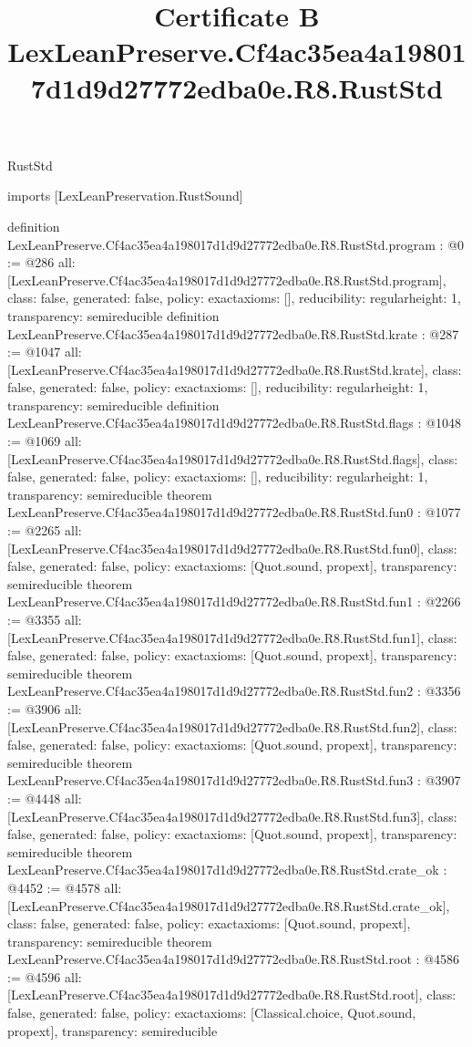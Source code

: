\begin{lexlean}{RustStd}
\title{Certificate B LexLeanPreserve.Cf4ac35ea4a198017d1d9d27772edba0e.R8.RustStd}
\begin{coremodule}
imports [LexLeanPreservation.RustSound]

definition LexLeanPreserve.Cf4ac35ea4a198017d1d9d27772edba0e.R8.RustStd.program : @0 := @286 {
  all: [LexLeanPreserve.Cf4ac35ea4a198017d1d9d27772edba0e.R8.RustStd.program],
  class: false,
  generated: false,
  policy: exact{axioms: []},
  reducibility: regular{height: 1},
  transparency: semireducible
}
definition LexLeanPreserve.Cf4ac35ea4a198017d1d9d27772edba0e.R8.RustStd.krate : @287 := @1047 {
  all: [LexLeanPreserve.Cf4ac35ea4a198017d1d9d27772edba0e.R8.RustStd.krate],
  class: false,
  generated: false,
  policy: exact{axioms: []},
  reducibility: regular{height: 1},
  transparency: semireducible
}
definition LexLeanPreserve.Cf4ac35ea4a198017d1d9d27772edba0e.R8.RustStd.flags : @1048 := @1069 {
  all: [LexLeanPreserve.Cf4ac35ea4a198017d1d9d27772edba0e.R8.RustStd.flags],
  class: false,
  generated: false,
  policy: exact{axioms: []},
  reducibility: regular{height: 1},
  transparency: semireducible
}
theorem LexLeanPreserve.Cf4ac35ea4a198017d1d9d27772edba0e.R8.RustStd.fun0 : @1077 := @2265 {
  all: [LexLeanPreserve.Cf4ac35ea4a198017d1d9d27772edba0e.R8.RustStd.fun0],
  class: false,
  generated: false,
  policy: exact{axioms: [Quot.sound, propext]},
  transparency: semireducible
}
theorem LexLeanPreserve.Cf4ac35ea4a198017d1d9d27772edba0e.R8.RustStd.fun1 : @2266 := @3355 {
  all: [LexLeanPreserve.Cf4ac35ea4a198017d1d9d27772edba0e.R8.RustStd.fun1],
  class: false,
  generated: false,
  policy: exact{axioms: [Quot.sound, propext]},
  transparency: semireducible
}
theorem LexLeanPreserve.Cf4ac35ea4a198017d1d9d27772edba0e.R8.RustStd.fun2 : @3356 := @3906 {
  all: [LexLeanPreserve.Cf4ac35ea4a198017d1d9d27772edba0e.R8.RustStd.fun2],
  class: false,
  generated: false,
  policy: exact{axioms: [Quot.sound, propext]},
  transparency: semireducible
}
theorem LexLeanPreserve.Cf4ac35ea4a198017d1d9d27772edba0e.R8.RustStd.fun3 : @3907 := @4448 {
  all: [LexLeanPreserve.Cf4ac35ea4a198017d1d9d27772edba0e.R8.RustStd.fun3],
  class: false,
  generated: false,
  policy: exact{axioms: [Quot.sound, propext]},
  transparency: semireducible
}
theorem LexLeanPreserve.Cf4ac35ea4a198017d1d9d27772edba0e.R8.RustStd.crate_ok : @4452 := @4578 {
  all: [LexLeanPreserve.Cf4ac35ea4a198017d1d9d27772edba0e.R8.RustStd.crate_ok],
  class: false,
  generated: false,
  policy: exact{axioms: [Quot.sound, propext]},
  transparency: semireducible
}
theorem LexLeanPreserve.Cf4ac35ea4a198017d1d9d27772edba0e.R8.RustStd.root : @4586 := @4596 {
  all: [LexLeanPreserve.Cf4ac35ea4a198017d1d9d27772edba0e.R8.RustStd.root],
  class: false,
  generated: false,
  policy: exact{axioms: [Classical.choice, Quot.sound, propext]},
  transparency: semireducible
}


\end{coremodule}
\end{lexlean}
